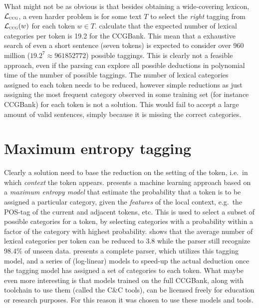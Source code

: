 What might not be as obvious is that besides obtaining a wide-covering lexicon, $\mathcal{L}_\textsc{ccg}$, a even harder problem is for some text $T$ to select the \emph{right} tagging from $\mathcal{L}_\textsc{ccg}(w)$ for each token $w \in T$. \citeauthor{ccgBank}  calculate that the expected number of lexical categories per token is 19.2 for the CCGBank. This mean that a exhaustive search of even a short sentence (seven tokens) is expected to consider over 960 million ($19.2^7 \approx \num{961852772}$) possible taggings. This is clearly not a feasible approach, even if the parsing can explore all possible deductions in polynomial time of the number of possible taggings. %
The number of lexical categories assigned to each token needs to be reduced, however simple reductions as just assigning the most frequent category  observed in some training set (for instance CCGBank) for each token is not a solution. This would fail to accept a large amount of valid sentences, simply because it is missing the correct categories. 

\section{Maximum entropy tagging}
\label{sec:maxEntropy}
Clearly a solution need to base the reduction on the setting of the token, i.e.\ in which \emph{context} the token appears. \citeauthor{suppertagging}  presents a machine learning approach based on a \emph{maximum entropy model} that estimate the probability that a token is to be assigned a particular category, given the \emph{features} of the local context, e.g.\ the POS-tag of the current and adjacent tokens, etc. This is used to select a subset of possible categories for a token, by selecting categories with a probability within a factor of the category with highest probability. \citeauthor{suppertagging} shows that the average number of lexical categories per token can be reduced to 3.8 while the parser still recognize 98.4\% of unseen data. \citeauthor{candc}  presents a complete parser, which utilizes this tagging model, and a series of (log-linear) models to speed-up the actual deduction once the tagging model has assigned a set of categories to each token. What maybe even more interesting is that models trained on the full CCGBank, along with toolchain to use them (called the C\&C tools), can be licensed freely for education or research purposes. For this reason it was chosen to use these models and tools.

